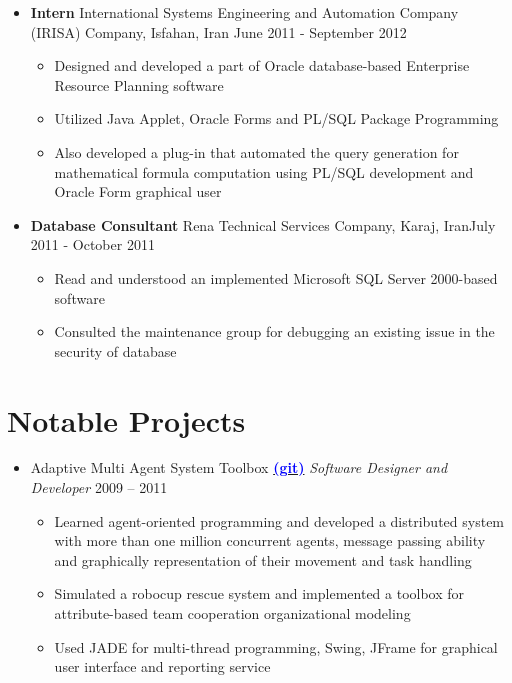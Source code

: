 \documentclass[letter]{res}
\begin{document}
\begin{resume}
\begin{itemize}[leftmargin=-.1in]
			\item \textbf{Intern} \newline
			International Systems Engineering and Automation Company (IRISA) Company, Isfahan, Iran \hfill June 2011 - September 2012\\
			\vspace{-4mm}
			\iflong
			\begin{itemize}
				\item Designed and developed a part of Oracle database-based Enterprise Resource Planning software
				\item Utilized Java Applet, Oracle Forms and PL/SQL Package Programming
				\item Also developed a plug-in that automated the query generation for mathematical formula computation using PL/SQL development and Oracle Form graphical user
			\end{itemize}
			\fi
			
			\item \textbf{Database Consultant}
			\newline
			Rena Technical Services Company, Karaj, Iran\hfill July 2011 - October 2011\\
			\vspace{-4mm}
			\iflong
			\begin{itemize}
				\item Read and understood an implemented Microsoft SQL Server 2000-based software
				\item Consulted the maintenance group for debugging an existing issue in the security of database
			\end{itemize}
		\end{itemize}
		
		
		\section{Notable Projects}
		\begin{itemize}[leftmargin=-.1in]
			\item Adaptive Multi Agent System Toolbox {\href{https://github.com/omid55/team_based_rescue_jade_multi_agent_system}{\textbf{\textcolor{blue}{(git)}}}} \newline
			{\sl Software Designer and Developer} \hfill 2009 – 2011\\
			\vspace{-4mm}
			\iflong
			\begin{itemize}
				\item Learned agent-oriented programming and developed a distributed system with more than one million concurrent agents, message passing ability and graphically representation of their movement and task handling
				\item Simulated a robocup rescue system and implemented a toolbox for 				attribute-based team cooperation organizational modeling
				\item Used JADE for multi-thread programming, Swing, JFrame for graphical user interface and reporting service
			\end{itemize}
			\fi
			

\end{itemize}
\end{resume}
\end{document}
